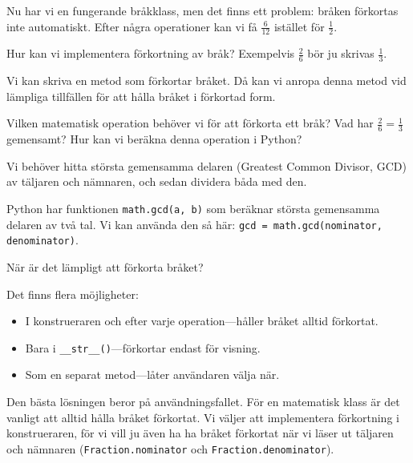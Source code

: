 Nu har vi en fungerande bråkklass, men det finns ett problem: bråken förkortas
inte automatiskt. Efter några operationer kan vi få \(\frac{6}{12}\) istället
för \(\frac{1}{2}\).

\begin{frame}
  \begin{exercise}
    Hur kan vi implementera förkortning av bråk?
    Exempelvis \(\frac{2}{6}\) bör ju skrivas \(\frac{1}{3}\).
  \end{exercise}
\end{frame}

Vi kan skriva en metod som förkortar bråket.
Då kan vi anropa denna metod vid lämpliga tillfällen för att hålla bråket i 
förkortad form.

\begin{frame}
  \begin{exercise}
    Vilken matematisk operation behöver vi för att förkorta ett bråk? Vad har 
    \(\frac{2}{6} = \frac{1}{3}\) gemensamt?
    Hur kan vi beräkna denna operation i Python?
  \end{exercise}
\end{frame}

Vi behöver hitta största gemensamma delaren (\foreignlanguage{english}{Greatest Common Divisor}, 
GCD) av täljaren och nämnaren, och sedan dividera båda med den.

Python har funktionen \texttt{math.gcd(a, b)} som beräknar största 
gemensamma delaren av två tal. Vi kan använda den så här:
\texttt{gcd = math.gcd(nominator, denominator)}.

\begin{frame}
  \begin{exercise}
    När är det lämpligt att förkorta bråket?
  \end{exercise}
\end{frame}

Det finns flera möjligheter:
\begin{itemize}
  \item I konstrueraren och efter varje operation---håller bråket alltid 
    förkortat.
  \item Bara i \texttt{__str__()}---förkortar endast för visning.
  \item Som en separat metod---låter användaren välja när.
\end{itemize}

Den bästa lösningen beror på användningsfallet. För en matematisk klass är 
det vanligt att alltid hålla bråket förkortat. Vi väljer att implementera 
förkortning i konstrueraren,
för vi vill ju även ha ha bråket förkortat när vi läser ut täljaren och 
nämnaren (\texttt{Fraction.nominator} och 
\texttt{Fraction.denominator}).


